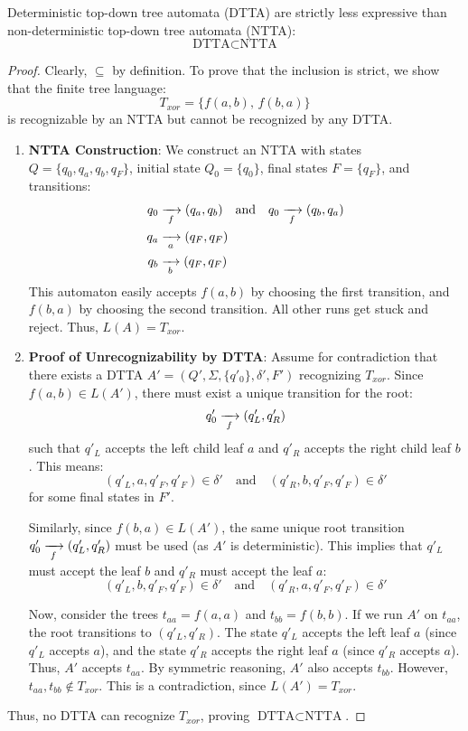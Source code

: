 \begin{theorem}
\label{thm:top-down-deterministic-limit}
Deterministic top-down tree automata (DTTA) are strictly less expressive than non-deterministic top-down tree automata (NTTA):
$$\text{DTTA} \subset \text{NTTA}$$
\end{theorem}

\begin{proof}
Clearly,  $\subseteq$  by definition. To prove that the inclusion is strict, we show that the finite tree language:
$$T_{xor} = \{ f(a, b), \, f(b, a) \}$$
is recognizable by an NTTA but cannot be recognized by any DTTA.
\begin{enumerate}
    \item \textbf{NTTA Construction}: We construct an NTTA with states $Q = \{q_0, q_a, q_b, q_F\}$, initial state $Q_0 = \{q_0\}$, final states $F = \{q_F\}$, and transitions:
    \begin{align*}
        q_0 &\xrightarrow[{\;f\;}]{} (q_a, q_b) \quad \text{and} \quad q_0 \xrightarrow[{\;f\;}]{} (q_b, q_a) \\
        q_a &\xrightarrow[{\;a\;}]{} (q_F, q_F) \\
        q_b &\xrightarrow[{\;b\;}]{} (q_F, q_F)
    \end{align*}
    This automaton easily accepts $f(a,b)$ by choosing the first transition, and $f(b,a)$ by choosing the second transition. All other runs get stuck and reject. Thus, $L(A) = T_{xor}$.
    
    \item \textbf{Proof of Unrecognizability by DTTA}: Assume for contradiction that there exists a DTTA $A' = (Q', \Sigma, \{q'_0\}, \delta', F')$ recognizing $T_{xor}$.
    Since $f(a,b) \in L(A')$, there must exist a unique transition for the root:
    $$q'_0 \xrightarrow[{\;f\;}]{} (q'_L, q'_R)$$
    such that $q'_L$ accepts the left child leaf $a$ and $q'_R$ accepts the right child leaf $b$. This means:
    $$(q'_L, a, q'_F, q'_F) \in \delta' \quad \text{and} \quad (q'_R, b, q'_F, q'_F) \in \delta'$$
    for some final states in $F'$.
    
    Similarly, since $f(b,a) \in L(A')$, the same unique root transition $q'_0 \xrightarrow[{\;f\;}]{} (q'_L, q'_R)$ must be used (as $A'$ is deterministic). This implies that $q'_L$ must accept the leaf $b$ and $q'_R$ must accept the leaf $a$:
    $$(q'_L, b, q'_F, q'_F) \in \delta' \quad \text{and} \quad (q'_R, a, q'_F, q'_F) \in \delta'$$
    
    Now, consider the trees $t_{aa} = f(a, a)$ and $t_{bb} = f(b, b)$.
    If we run $A'$ on $t_{aa}$, the root transitions to $(q'_L, q'_R)$. The state $q'_L$ accepts the left leaf $a$ (since $q'_L$ accepts $a$), and the state $q'_R$ accepts the right leaf $a$ (since $q'_R$ accepts $a$). Thus, $A'$ accepts $t_{aa}$.
    By symmetric reasoning, $A'$ also accepts $t_{bb}$.
    However, $t_{aa}, t_{bb} \notin T_{xor}$. This is a contradiction, since $L(A') = T_{xor}$.
\end{enumerate}
Thus, no DTTA can recognize $T_{xor}$, proving $\text{DTTA} \subset \text{NTTA}$.
\end{proof}

